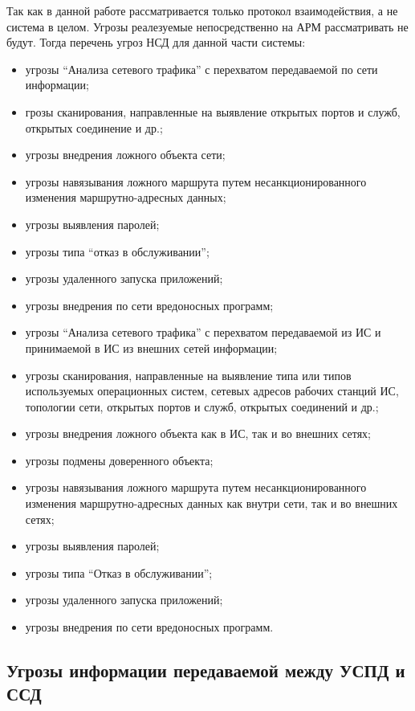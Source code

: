 Так как в данной работе рассматривается только протокол взаимодействия, а не система в целом. Угрозы реалезуемые непосредственно на АРМ рассматривать не будут. Тогда перечень угроз НСД для данной части системы:

\begin{itemize}
 \item угрозы ``Анализа сетевого трафика'' с перехватом передаваемой по сети информации;
 \item грозы сканирования, направленные на выявление открытых портов и служб, открытых соединение и др.;
 \item угрозы внедрения ложного объекта сети;
 \item угрозы навязывания ложного маршрута путем несанкционированного изменения маршрутно-адресных данных;
 \item угрозы выявления паролей;
 \item угрозы типа ``отказ в обслуживании'';
 \item угрозы удаленного запуска приложений;
 \item угрозы внедрения по сети вредоносных программ;
 \item угрозы ``Анализа  сетевого  трафика'' с  перехватом  передаваемой из ИС и принимаемой в ИС из внешних сетей информации;
 \item угрозы  сканирования,  направленные  на  выявление типа  или  типов используемых операционных систем, сетевых адресов рабочих станций ИС, топологии сети, открытых портов и служб, открытых соединений и др.;
 \item угрозы внедрения ложного объекта как в ИС, так и во внешних сетях;
 \item угрозы подмены доверенного объекта;
 \item угрозы  навязывания  ложного  маршрута  путем  несанкционированного изменения  маршрутно-адресных  данных  как  внутри сети,  так  и  во внешних сетях;
 \item угрозы выявления паролей;
 \item угрозы типа ``Отказ в обслуживании'';
 \item угрозы удаленного запуска приложений;
 \item угрозы внедрения по сети вредоносных программ.
\end{itemize}

\subsection{Угрозы информации передаваемой между УСПД и ССД}

